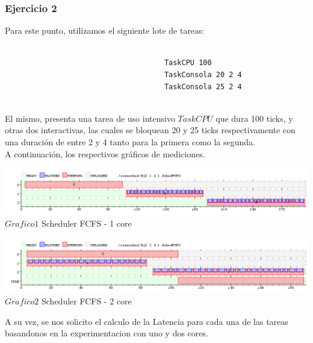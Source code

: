 \subsubsection[Resolución Ejercicio 2]{Ejercicio 2}

\indent Para este punto, utilizamos el siguiente lote de tareas:
\begin{verbatim}
 
                                     TaskCPU 100
                                     TaskConsola 20 2 4
                                     TaskConsola 25 2 4


\end{verbatim}

\indent El mismo, presenta una tarea de uso intensivo $TaskCPU$ que dura 100 ticks, y otras dos interactivas, las cuales se
bloquean 20 y 25 ticks respectivamente con una duración de entre 2 y 4 tanto para la primera como la segunda.\\
A continuación, los respectivos gráficos de mediciones.


\vspace*{0.3cm} \vspace*{0.3cm}
  \begin{center}
 \includegraphics[scale=0.5]{./Test/ej2_1.png}
 { $Grafico 1$ Scheduler FCFS - 1 core }
 \end{center}
  \vspace*{0.3cm}
 
  
\vspace*{0.3cm} \vspace*{0.3cm}
  \begin{center}
 \includegraphics[scale=0.5]{./Test/ej2_2.png}
 { $Grafico 2$ Scheduler FCFS - 2 core }
 \end{center}
  \vspace*{0.3cm}

A su vez, se nos solicito el calculo de la Latencia para cada una de las tareas basandonos en la 
experimentacion con uno y dos cores.\\


